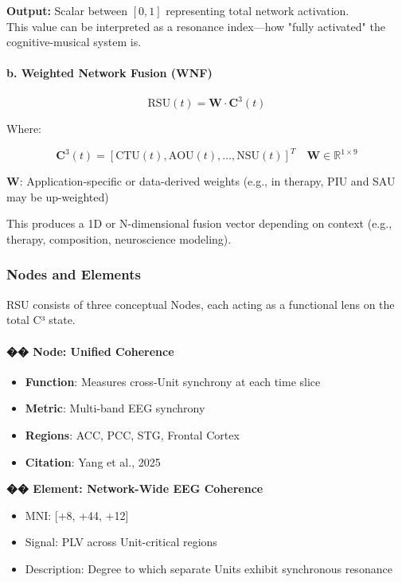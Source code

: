 \textbf{Output:} Scalar between $[0,1]$ representing total network activation.\\
This value can be interpreted as a resonance index—how "fully activated" the cognitive-musical system is.

\paragraph{b. Weighted Network Fusion (WNF)}

\[
\text{RSU}(t) = \mathbf{W} \cdot \mathbf{C}^3(t)
\]

Where:

\[
\mathbf{C}^3(t) = [\text{CTU}(t), \text{AOU}(t), \ldots, \text{NSU}(t)]^T \quad \mathbf{W} \in \mathbb{R}^{1 \times 9}
\]

$\mathbf{W}$: Application-specific or data-derived weights (e.g., in therapy, PIU and SAU may be up-weighted)

This produces a 1D or N-dimensional fusion vector depending on context (e.g., therapy, composition, neuroscience modeling).

\subsubsection*{Nodes and Elements}

RSU consists of three conceptual Nodes, each acting as a functional lens on the total C³ state.

\paragraph{�� Node: Unified Coherence}

\begin{itemize}
    \item \textbf{Function}: Measures cross-Unit synchrony at each time slice
    \item \textbf{Metric}: Multi-band EEG synchrony
    \item \textbf{Regions}: ACC, PCC, STG, Frontal Cortex
    \item \textbf{Citation}: Yang et al., 2025
\end{itemize}

\textbf{�� Element: Network-Wide EEG Coherence}

\begin{itemize}
    \item MNI: [+8, +44, +12]
    \item Signal: PLV across Unit-critical regions
    \item Description: Degree to which separate Units exhibit synchronous resonance
\end{itemize}

